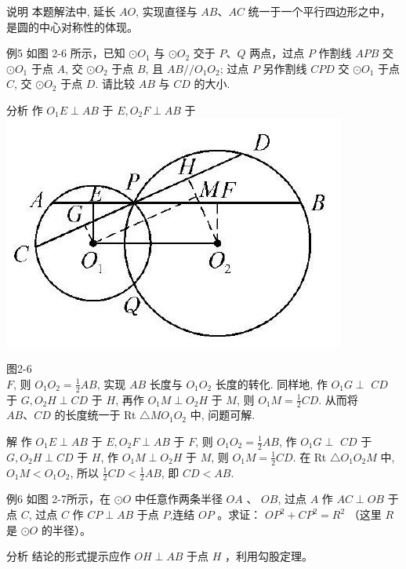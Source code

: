 \documentclass[10pt]{article}
\begin{document}
说明 本题解法中, 延长 $A O$, 实现直径与 $A B 、 A C$ 统一于一个平行四边形之中，是圆的中心对称性的体现。

例5 如图 2-6 所示，已知 $\odot O_{1}$ 与 $\odot O_{2}$ 交于 $P 、 Q$ 两点，过点 $P$ 作割线 $A P B$ 交 $\odot O_{1}$ 于点 $A$, 交 $\odot O_{2}$ 于点 $B$, 且 $A B / / O_{1} O_{2}$; 过点 $P$ 另作割线 $C P D$ 交 $\odot O_{1}$ 于点 $C$, 交 $\odot O_{2}$ 于点 $D$. 请比较 $A B$ 与 $C D$ 的大小.

分析 作 $O_{1} E \perp A B$ 于 $E, O_{2} F \perp A B$ 于\\
\includegraphics[max width=\textwidth, center]{2024_10_30_66b8e5e701da2093c133g-019(1)}

图2-6\\
$F$, 则 $O_{1} O_{2}=\frac{1}{2} A B$, 实现 $A B$ 长度与 $O_{1} O_{2}$ 长度的转化. 同样地, 作 $O_{1} G \perp$ $C D$ 于 $G, O_{2} H \perp C D$ 于 $H$, 再作 $O_{1} M \perp O_{2} H$ 于 $M$, 则 $O_{1} M=\frac{1}{2} C D$. 从而将 $A B 、 C D$ 的长度统一于 Rt $\triangle M O_{1} O_{2}$ 中, 问题可解.

解 作 $O_{1} E \perp A B$ 于 $E, O_{2} F \perp A B$ 于 $F$, 则 $O_{1} O_{2}=\frac{1}{2} A B$, 作 $O_{1} G \perp$ $C D$ 于 $G, O_{2} H \perp C D$ 于 $H$, 作 $O_{1} M \perp O_{2} H$ 于 $M$, 则 $O_{1} M=\frac{1}{2} C D$. 在 Rt $\triangle O_{1} O_{2} M$ 中, $O_{1} M<O_{1} O_{2}$, 所以 $\frac{1}{2} C D<\frac{1}{2} A B$, 即 $C D<A B$.

例6 如图 2-7所示，在 $\odot O$ 中任意作两条半径 $O A$ 、 $O B$, 过点 $A$ 作 $A C \perp O B$ 于点 $C$, 过点 $C$ 作 $C P \perp A B$ 于点 $P$,连结 $O P$ 。求证： $O P^{2}+C P^{2}=R^{2}$ （这里 $R$ 是 $\odot O$ 的半径）。

分析 结论的形式提示应作 $O H \perp A B$ 于点 $H$ ，利用勾股定理。
\end{document}
